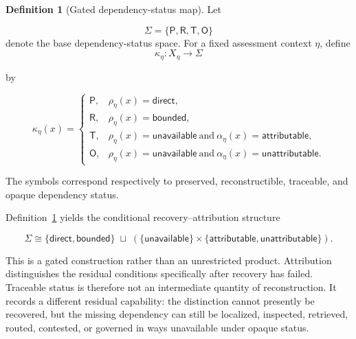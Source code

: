 \documentclass[11pt]{article}
\theoremstyle{definition}
\newtheorem{definition}[proposition]{Definition}
\theoremstyle{remark}
\begin{document}
\begin{definition}[Gated dependency-status map]
\label{def:gated-status-map}
Let

\[
\Sigma=
\{
\mathsf P,\mathsf R,\mathsf T,\mathsf O
\}
\]
denote the base dependency-status space. For a fixed assessment
context \(\eta\), define
\[
\kappa_{\eta}:X_{\eta}\rightarrow\Sigma
\]

by

\[
\kappa_{\eta}(x)=
\begin{cases}
\mathsf P,
&
\rho_{\eta}(x)=\mathsf{direct},
\\[0.4em]
\mathsf R,
&
\rho_{\eta}(x)=\mathsf{bounded},
\\[0.4em]
\mathsf T,
&
\rho_{\eta}(x)=\mathsf{unavailable}
\ \text{and}\
\alpha_{\eta}(x)=\mathsf{attributable},
\\[0.4em]
\mathsf O,
&
\rho_{\eta}(x)=\mathsf{unavailable}
\ \text{and}\
\alpha_{\eta}(x)=\mathsf{unattributable}.
\end{cases}
\]

The symbols correspond respectively to preserved, reconstructible, traceable, and opaque dependency status.
\end{definition}

Definition~\ref{def:gated-status-map} yields the conditional recovery--attribution structure

\[
\Sigma
\cong
\{
\mathsf{direct},
\mathsf{bounded}
\}
\;\sqcup\;
\left(
\{
\mathsf{unavailable}
\}
\times
\{
\mathsf{attributable},
\mathsf{unattributable}
\}
\right).
\]

This is a gated construction rather than an unrestricted product. Attribution distinguishes the residual conditions specifically after recovery has failed. Traceable status is therefore not an intermediate quantity of reconstruction. It records a different residual capability: the distinction cannot presently be recovered, but the missing dependency can still be localized, inspected, retrieved, routed, contested, or governed in ways unavailable under opaque status.
\end{document}
